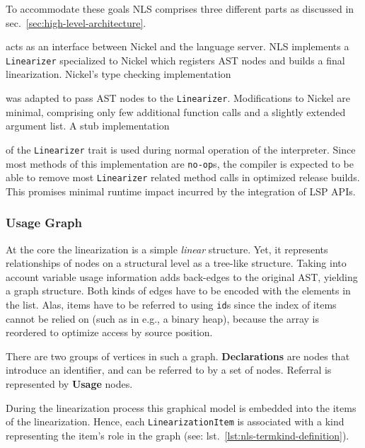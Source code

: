 \documentclass[
  a4paper,
  bibtex,
  english,
  nomenclature]{kthlatex/kththesis/kththesis}
\providecommand{\tightlist}{%
  \setlength{\itemsep}{0pt}\setlength{\parskip}{0pt}}
\begin{document}
To accommodate these goals NLS comprises three different parts as
discussed in sec.~\ref{sec:high-level-architecture}.

\begin{description}
\tightlist
\item[The \texttt{Linearizer} trait]
acts as an interface between Nickel and the language server. NLS
implements a \texttt{Linearizer} specialized to Nickel which registers
AST nodes and builds a final linearization. Nickel's type checking
implementation

was adapted to pass AST nodes to the \texttt{Linearizer}. Modifications
to Nickel are minimal, comprising only few additional function calls and
a slightly extended argument list. A stub implementation

of the \texttt{Linearizer} trait is used during normal operation of the
interpreter. Since most methods of this implementation are
\texttt{no-op}s, the compiler is expected to be able to remove most
\texttt{Linearizer} related method calls in optimized release builds.
This promises minimal runtime impact incurred by the integration of LSP
APIs.
\end{description}

\hypertarget{sec:usage-graph}{%
\subsubsection{Usage Graph}\label{sec:usage-graph}}

At the core the linearization is a simple \emph{linear} structure. Yet,
it represents relationships of nodes on a structural level as a
tree-like structure. Taking into account variable usage information adds
back-edges to the original AST, yielding a graph structure. Both kinds
of edges have to be encoded with the elements in the list. Alas, items
have to be referred to using \texttt{id}s since the index of items
cannot be relied on (such as in e.g., a binary heap), because the array
is reordered to optimize access by source position.

There are two groups of vertices in such a graph. \textbf{Declarations}
are nodes that introduce an identifier, and can be referred to by a set
of nodes. Referral is represented by \textbf{Usage} nodes.

During the linearization process this graphical model is embedded into
the items of the linearization. Hence, each \texttt{LinearizationItem}
is associated with a kind representing the item's role in the graph
(see: lst.~\ref{lst:nls-termkind-definition}).
\end{document}
